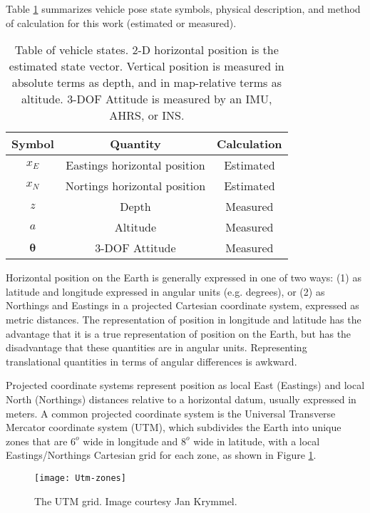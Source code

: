 Table \ref{tab:states} summarizes vehicle pose state symbols, physical description, and method of calculation for this work (estimated or measured).

\begin{table}[h]
\centering
\begin{tabular}{|c|c|c|}
\hline
\textbf{Symbol} & \textbf{Quantity} & \textbf{Calculation} \\ \hline
$x_E$ & Eastings horizontal position & Estimated \\ \hline
$x_N$ & Nortings horizontal position & Estimated \\ \hline
$z$ & Depth & Measured \\ \hline
$a$ & Altitude & Measured \\ \hline
$\boldsymbol{\theta}$ & 3-DOF Attitude & Measured \\ \hline
\end{tabular}
\caption{Table of vehicle states. 2-D horizontal position is the estimated state vector. Vertical position is measured in absolute terms as depth, and in map-relative terms as altitude. 3-DOF Attitude is measured by an IMU, AHRS, or INS.}
\label{tab:states}
\end{table}

Horizontal position on the Earth is generally expressed in one of two ways: (1) as latitude and longitude expressed in angular units (e.g. degrees), or (2) as Northings and Eastings in a projected Cartesian coordinate system, expressed as metric distances.
The representation of position in longitude and latitude has the advantage that it is a true representation of position on the Earth, but has the disadvantage that these quantities are in angular units.
Representing translational quantities in terms of angular differences is awkward.

Projected coordinate systems represent position as local East (Eastings) and local North (Northings) distances relative to a horizontal datum, usually expressed in meters. 
A common projected coordinate system is the Universal Transverse Mercator coordinate system (UTM), which subdivides the Earth into unique zones that are $6^{o}$ wide in longitude and $8^{o}$ wide in latitude, with a local Eastings/Northings Cartesian grid for each zone, as shown in Figure \ref{fig:UTM}.

\begin{figure}[!h]
	\centering
		\texttt{[image: Utm-zones]}
	\caption{The UTM grid. Image courtesy Jan Krymmel. }
	\label{fig:UTM}
\end{figure}


